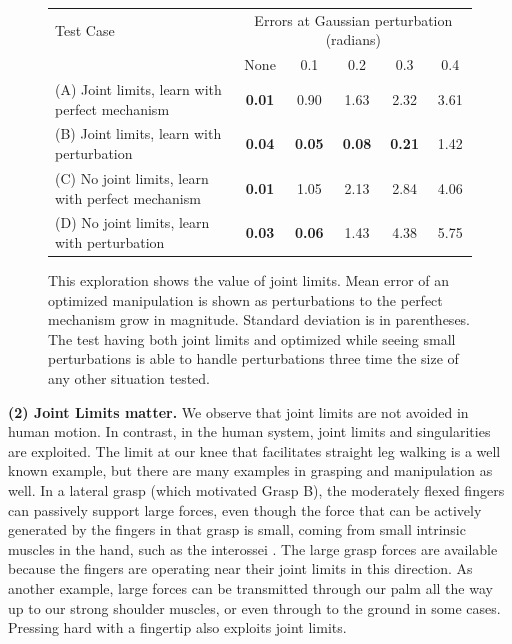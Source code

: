 \begin{figure}
\begin{center}
\begin{tabular}{l|c|c|c|c|c|}
Test Case & \multicolumn{5}{c}{Errors at Gaussian perturbation (radians)}  \\
                & None & 0.1  & 0.2  & 0.3  &  0.4  \\ \hline 
(A) Joint limits, learn with perfect mechanism &	{\bf 0.01} & 0.90 & 1.63 &	2.32 & 3.61 \\
(B) Joint limits, learn with perturbation	&  {\bf 0.04}	& {\bf 0.05}	& {\bf 0.08} &	{\bf 0.21} &	1.42 \\
(C) No joint limits, learn with perfect mechanism &	{\bf 0.01}	&	1.05&	2.13	& 2.84  &	4.06 \\
(D) No joint limits, learn with perturbation &	{\bf 0.03}	& {\bf 0.06} 	&1.43	&4.38	&5.75 \\
\end{tabular}
\end{center}
\caption{This exploration shows the value of joint limits.   Mean error of an optimized manipulation is shown as perturbations to the perfect mechanism grow in magnitude.    Standard deviation is in parentheses.  The test having both joint limits and optimized while seeing small perturbations is able to handle perturbations three time the size of any other situation tested.}
\label{JointLimitAnalysis}
\end{figure}

\smallskip\noindent
{\bf (2) Joint Limits matter.}   We observe that joint limits are not avoided in human motion.   In contrast, in the human system, joint limits and singularities are exploited.    The limit at our knee that facilitates straight leg walking is a well known example, but there are many examples in grasping and manipulation as well.  In a lateral grasp (which motivated Grasp B), the moderately flexed fingers can passively support large forces, even though the force that can be actively generated by the fingers in that grasp is small, coming from small intrinsic muscles in the hand, such as the interossei \cite{brand1999clinical}.   The large grasp forces are available because the fingers are operating near their joint limits in this direction.   As another example, large forces can be transmitted through our palm all the way up to our strong shoulder muscles, or even through to the ground in some cases.   Pressing hard with a fingertip also exploits joint limits.


